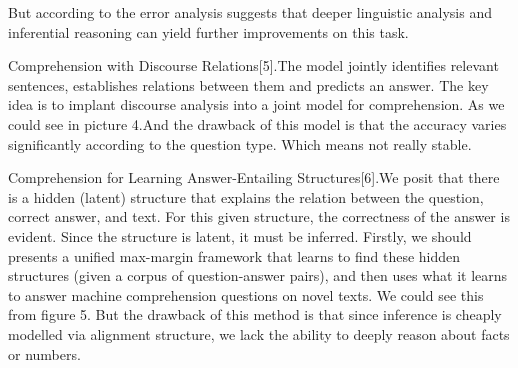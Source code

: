 \documentclass[runningheads,a4paper]{llncs}
\begin{document}


But according to the error analysis suggests that deeper linguistic analysis and inferential reasoning can yield further improvements on this task.


Comprehension with Discourse Relations[5].The model jointly identifies relevant sentences, establishes relations between them and predicts an answer. The key idea is to implant discourse analysis into a joint model for comprehension. As we could see in picture 4.And the drawback of this model is that the accuracy varies significantly according to the question type. Which means not really stable. 

Comprehension for Learning Answer-Entailing Structures[6].We posit that there is a hidden (latent) structure that explains the relation between the question, correct answer, and text. For this given structure, the correctness of the answer is evident. Since the structure is latent, it must be inferred. Firstly, we should presents a unified max-margin framework that learns to find these hidden structures (given a corpus of question-answer pairs), and then uses what it learns to answer machine comprehension questions on novel texts. We could see this from figure 5. But the drawback of this method is that since inference is cheaply modelled via alignment structure, we lack the ability to deeply reason about facts or numbers. 
\end{document}
